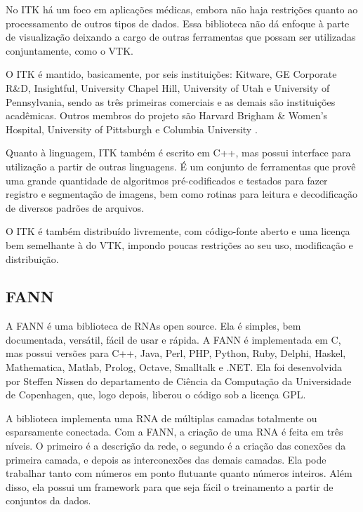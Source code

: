 No ITK há um foco em aplicações médicas, embora não haja restrições quanto ao processamento de outros tipos de dados. Essa biblioteca não dá enfoque à parte de visualização deixando a cargo de outras ferramentas que possam ser utilizadas conjuntamente, como o VTK.

O ITK é mantido, basicamente, por seis instituições: Kitware, GE Corporate R\&D, Insightful, University Chapel Hill, University of Utah e University of Pennsylvania, sendo as três primeiras comerciais e as demais são instituições acadêmicas. Outros membros do projeto são Harvard Brigham \& Women's Hospital, University of Pittsburgh e Columbia University \cite{itk-page}.

Quanto à linguagem, ITK também é escrito em C++, mas possui interface para utilização a partir de outras linguagens. É um conjunto de ferramentas que provê uma grande quantidade de algoritmos pré-codificados e testados para fazer registro e segmentação de imagens, bem como rotinas para leitura e decodificação de diversos padrões de arquivos.

O ITK é também distribuído livremente, com código-fonte aberto e uma licença bem semelhante à do VTK, impondo poucas restrições ao seu uso, modificação e distribuição.


\subsection{FANN}

A FANN %
 é uma biblioteca de RNAs open source. Ela é simples, bem documentada, versátil, fácil de usar e rápida. A FANN é implementada em C, mas possui versões para C++, Java, Perl, PHP, Python, Ruby, Delphi, Haskel, Mathematica, Matlab, Prolog, Octave, Smalltalk e .NET. Ela foi desenvolvida por Steffen Nissen do departamento de Ciência da Computação da Universidade de Copenhagen, que, logo depois, liberou o código sob a licença GPL.

A biblioteca implementa uma RNA de múltiplas camadas totalmente ou esparsamente conectada. Com a FANN, a criação de uma RNA é feita em três níveis. O primeiro é a descrição da rede, o segundo é a criação das conexões da primeira camada, e depois as interconexões das demais camadas. Ela pode trabalhar tanto com números em ponto flutuante quanto números inteiros. Além disso, ela possui um framework para que seja fácil o treinamento a partir de conjuntos da dados.

